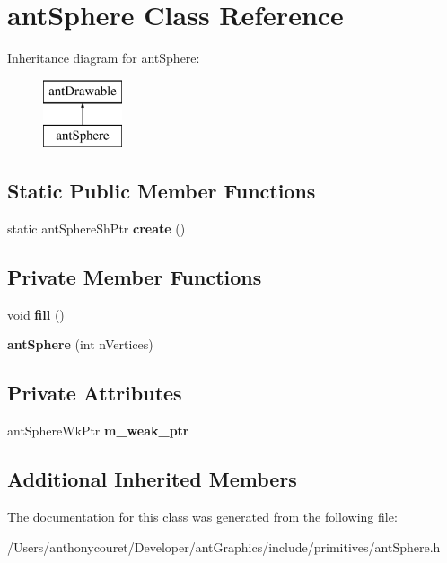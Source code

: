 \hypertarget{classant_sphere}{\section{ant\+Sphere Class Reference}
\label{classant_sphere}
}
Inheritance diagram for ant\+Sphere\+:\begin{figure}[H]
\begin{center}
\leavevmode
\includegraphics[height=2.000000cm]{classant_sphere}
\end{center}
\end{figure}
\subsection*{Static Public Member Functions}
\begin{DoxyCompactItemize}
\item 
\hypertarget{classant_sphere_a8bd56759dcdbd88c1ae05e00d426a527}{static ant\+Sphere\+Sh\+Ptr {\bfseries create} ()}\label{classant_sphere_a8bd56759dcdbd88c1ae05e00d426a527}

\end{DoxyCompactItemize}
\subsection*{Private Member Functions}
\begin{DoxyCompactItemize}
\item 
\hypertarget{classant_sphere_adb2cfd74c195ceb9c6c0a0274c170bc8}{void {\bfseries fill} ()}\label{classant_sphere_adb2cfd74c195ceb9c6c0a0274c170bc8}

\item 
\hypertarget{classant_sphere_a6dd3b41d2fe037bdb6b406abc29a28fc}{{\bfseries ant\+Sphere} (int n\+Vertices)}\label{classant_sphere_a6dd3b41d2fe037bdb6b406abc29a28fc}

\end{DoxyCompactItemize}
\subsection*{Private Attributes}
\begin{DoxyCompactItemize}
\item 
\hypertarget{classant_sphere_ad1891361ec747beaf4c333c8b5d9ec1f}{ant\+Sphere\+Wk\+Ptr {\bfseries m\+\_\+weak\+\_\+ptr}}\label{classant_sphere_ad1891361ec747beaf4c333c8b5d9ec1f}

\end{DoxyCompactItemize}
\subsection*{Additional Inherited Members}


The documentation for this class was generated from the following file\+:\begin{DoxyCompactItemize}
\item 
/\+Users/anthonycouret/\+Developer/ant\+Graphics/include/primitives/ant\+Sphere.\+h\end{DoxyCompactItemize}
